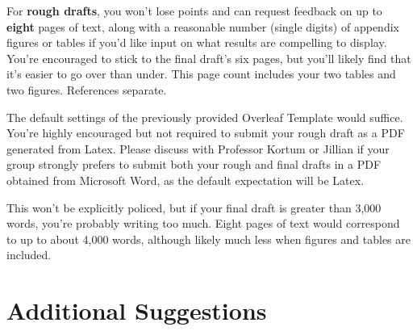 For \textbf{rough drafts}, you won't lose points and can request feedback on up to \textbf{eight} pages of text, along with a reasonable number (single digits) of appendix figures or tables if you'd like input on what results are compelling to display. You're encouraged to stick to the final draft's six pages, but you'll likely find that it's easier to go over than under. This page count includes your two tables and two figures. References separate.

The default settings of the previously provided Overleaf Template would suffice. You're highly encouraged but not required to submit your rough draft as a PDF generated from Latex. Please discuss with Professor Kortum or Jillian if your group strongly prefers to submit both your rough and final drafts in a PDF obtained from Microsoft Word, as the default expectation will be Latex. 

This won't be explicitly policed, but if your final draft is greater than 3,000 words, you're probably writing too much. Eight pages of text would correspond to up to about 4,000 words, although likely much less when figures and tables are included. 


\section{Additional Suggestions}

